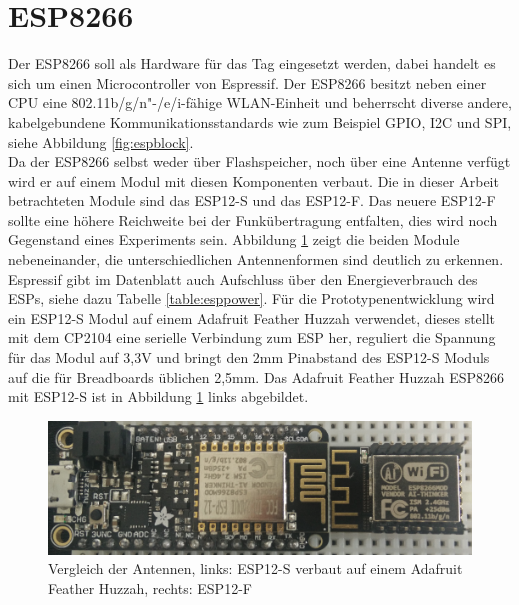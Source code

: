 \section{ESP8266}
Der ESP8266 soll als Hardware für das Tag eingesetzt werden, dabei handelt es sich um einen Microcontroller von Espressif.
Der ESP8266 besitzt neben einer CPU eine 802.11b/g/n"-/e/i-fähige WLAN-Einheit und beherrscht diverse andere, kabelgebundene Kommunikationsstandards wie zum Beispiel GPIO, I2C und SPI, siehe Abbildung \ref{fig:espblock}. \\
Da der ESP8266 selbst weder über Flashspeicher, noch über eine Antenne verfügt wird er auf einem Modul mit diesen Komponenten verbaut. 
Die in dieser Arbeit betrachteten Module sind das ESP12-S und das ESP12-F.
Das neuere ESP12-F sollte eine höhere Reichweite bei der Funkübertragung entfalten, dies wird noch Gegenstand eines Experiments sein.
Abbildung \ref{fig:espmodules} zeigt die beiden Module nebeneinander, die unterschiedlichen Antennenformen sind deutlich zu erkennen.\\
Espressif gibt im Datenblatt auch Aufschluss über den Energieverbrauch des ESPs, siehe dazu Tabelle \ref{table:esppower}.
Für die Prototypenentwicklung wird ein ESP12-S Modul auf einem Adafruit Feather Huzzah verwendet, dieses stellt mit dem CP2104 eine serielle Verbindung zum ESP her, reguliert die Spannung für das Modul auf 3,3V und bringt den 2mm Pinabstand des ESP12-S Moduls auf die für Breadboards üblichen 2,5mm.
Das Adafruit Feather Huzzah ESP8266 mit ESP12-S ist in Abbildung \ref{fig:espmodules} links abgebildet.

\begin{figure}[h]
  \centering
	\includegraphics[width=\textwidth]{images/espmodules.png}
  \caption{Vergleich der Antennen, links: ESP12-S verbaut auf einem Adafruit Feather Huzzah, rechts: ESP12-F}
  \label{fig:espmodules}
\end{figure}

